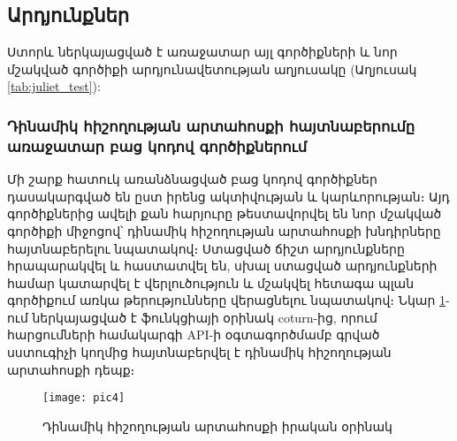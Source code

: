 {
    \subsection{Արդյունքներ}\label{subsec:results}
    Ստորև ներկայացված է առաջատար այլ գործիքների և
    նոր մշակված գործիքի արդյունավետության աղյուսակը (Աղյուսակ \ref{tab:juliet_test}):
    

    \subsubsection{Դինամիկ հիշողության արտահոսքի հայտնաբերումը առաջատար բաց կոդով գործիքներում}
    Մի շարք հատուկ առանձնացված բաց կոդով գործիքներ դասակարգված են ըստ իրենց ակտիվության և կարևորության։ Այդ գործիքներից
    ավելի քան հարյուրը թեստավորվել են նոր մշակված գործիքի միջոցով՝ դինամիկ հիշողության արտահոսքի խնդիրները հայտնաբերելու
    նպատակով։ Ստացված ճիշտ արդյունքները հրապարակվել և
    հաստատվել են, սխալ ստացված արդյունքների համար կատարվել է վերլուծություն և մշակվել հետագա պլան գործիքում առկա
    թերությունները վերացնելու նպատակով։ Նկար \ref{fig:figure4}-ում ներկայացված է ֆունկցիայի օրինակ
    coturn\cite{COTURN}-ից, որում հարցումների համակարգի API-ի օգտագործմամբ գրված
    սստուգիչի կողմից հայտնաբերվել է դինամիկ հիշողության արտահոսքի դեպք։

    \begin{figure}[h]
        \centering
        \texttt{[image: pic4]}
        \caption{Դինամիկ հիշողության արտահոսքի իրական օրինակ}
        \label{fig:figure4}
    \end{figure}
}